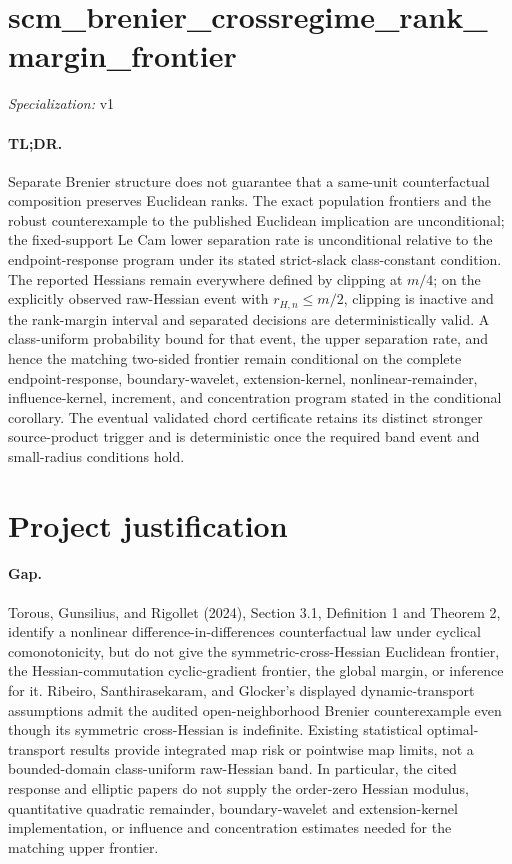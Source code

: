 \documentclass{article}
\begin{document}
\sloppy

\section*{scm\_\allowbreak{}brenier\_\allowbreak{}crossregime\_\allowbreak{}rank\_\allowbreak{}margin\_\allowbreak{}frontier}

\noindent\textit{Specialization:} v1\par

\paragraph{TL;DR.} Separate Brenier structure does not guarantee that a same-unit counterfactual composition preserves Euclidean ranks. The exact population frontiers and the robust counterexample to the published Euclidean implication are unconditional; the fixed-support Le Cam lower separation rate is unconditional relative to the endpoint-response program under its stated strict-slack class-constant condition. The reported Hessians remain everywhere defined by clipping at \(m/4\); on the explicitly observed raw-Hessian event with \(r_{H,n}\le m/2\), clipping is inactive and the rank-margin interval and separated decisions are deterministically valid. A class-uniform probability bound for that event, the upper separation rate, and hence the matching two-sided frontier remain conditional on the complete endpoint-response, boundary-wavelet, extension-kernel, nonlinear-remainder, influence-kernel, increment, and concentration program stated in the conditional corollary. The eventual validated chord certificate retains its distinct stronger source-product trigger and is deterministic once the required band event and small-radius conditions hold.

\section{Project justification}

\paragraph{Gap.} Torous, Gunsilius, and Rigollet (2024), Section 3.1, Definition 1 and Theorem 2, identify a nonlinear difference-in-differences counterfactual law under cyclical comonotonicity, but do not give the symmetric-cross-Hessian Euclidean frontier, the Hessian-commutation cyclic-gradient frontier, the global margin, or inference for it. Ribeiro, Santhirasekaram, and Glocker's displayed dynamic-transport assumptions admit the audited open-neighborhood Brenier counterexample even though its symmetric cross-Hessian is indefinite. Existing statistical optimal-transport results provide integrated map risk or pointwise map limits, not a bounded-domain class-uniform raw-Hessian band. In particular, the cited response and elliptic papers do not supply the order-zero Hessian modulus, quantitative quadratic remainder, boundary-wavelet and extension-kernel implementation, or influence and concentration estimates needed for the matching upper frontier.
\end{document}
